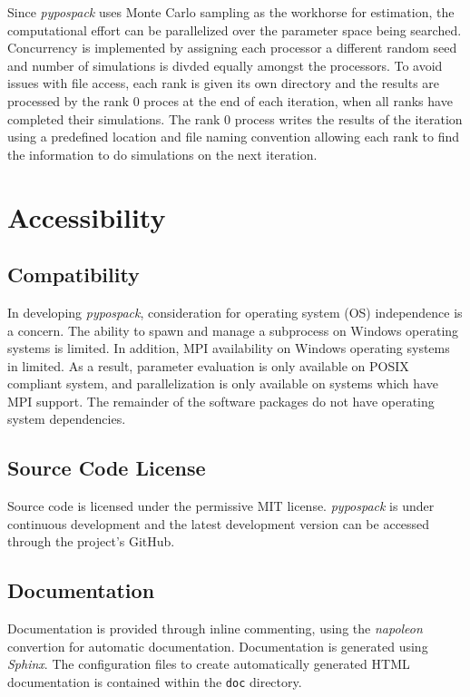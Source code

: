 Since \emph{pypospack} uses Monte Carlo sampling as the workhorse for estimation, the computational effort can be parallelized over the parameter space being searched.  Concurrency is implemented by assigning each processor a different random seed and number of simulations is divded equally amongst the processors.  To avoid issues with file access, each rank is given its own directory and the results are processed by the rank $0$ proces at the end of each iteration, when all ranks have completed their simulations.  The rank $0$ process writes the results of the iteration using a predefined location and file naming convention allowing each rank to find the information to do simulations on the next iteration.

\section{Accessibility}
\label{sec:software_acessibility}

\subsection{Compatibility}
\label{sec:comptability}

In developing \emph{pypospack}, consideration for operating system (OS) independence is a concern.  The ability to spawn and manage a subprocess on Windows operating systems is limited.  In addition, MPI availability on Windows operating systems in limited.
As a result, parameter evaluation is only available on POSIX compliant system, and parallelization is only available on systems which have MPI support.  The remainder of the software packages do not have operating system dependencies.

\subsection{Source Code License}

Source code is licensed under the permissive MIT license.  \emph{pypospack} is under continuous development and the latest development version can be accessed through the project's GitHub.

\subsection{Documentation}

Documentation is provided through inline commenting, using the \emph{napoleon} convertion for automatic documentation.  Documentation is generated using \emph{Sphinx}.  The configuration files to create automatically generated HTML documentation is contained within the \verb|doc| directory.

